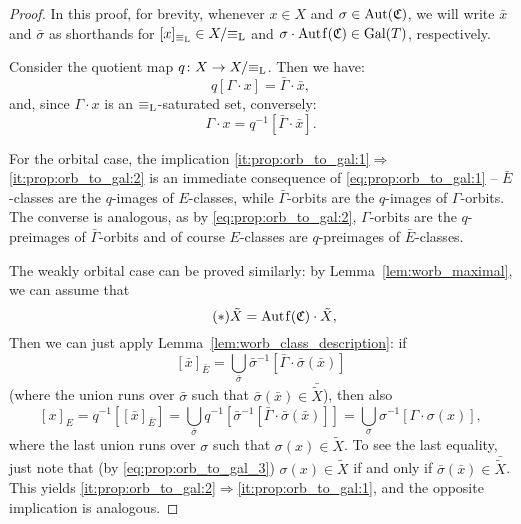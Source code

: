 	\begin{proof}
		In this proof, for brevity, whenever $x\in X$ and $\sigma \in \operatorname{{Aut}}({\mathfrak C})$, we will write $\bar x$ and $\bar \sigma$ as shorthands for $[x]_{\equiv_{\mathrm{L}}}\in X/{\equiv_{\mathrm{L}}}$ and $\sigma\cdot \Autf(\fC)\in \Gal(T)$, respectively.
		
		Consider the quotient map $q\colon X\to X/{\equiv_{\mathrm{L}}}$. Then we have:
		\begin{equation}
		\label{eq:prop:orb_to_gal:1}
		\tag{$\dagger$}
		q[\Gamma\cdot x]=\bar{\Gamma}\cdot \bar x,
		\end{equation}
		and, since $\Gamma\cdot x$ is an $\equiv_{\mathrm{L}}$-saturated set, conversely:
		\begin{equation}
		\label{eq:prop:orb_to_gal:2}
		\tag{$\dagger\dagger$}
		\Gamma\cdot x=q^{-1}[\bar{\Gamma}\cdot \bar x].
		\end{equation}
		
		
		For the orbital case, the implication \ref{it:prop:orb_to_gal:1}$\Rightarrow$\ref{it:prop:orb_to_gal:2} is an immediate consequence of \eqref{eq:prop:orb_to_gal:1} -- $\bar E$-classes are the $q$-images of $E$-classes, while $\bar{\Gamma}$-orbits are the $q$-images of $\Gamma$-orbits. The converse is analogous, as by \eqref{eq:prop:orb_to_gal:2}, $\Gamma$-orbits are the $q$-preimages of $\bar \Gamma$-orbits and of course $E$-classes are $q$-preimages of $\bar E$-classes.
		
		The weakly orbital case can be proved similarly: by Lemma~\ref{lem:worb_maximal}, we can assume that
		\begin{equation}
		\label{eq:prop:orb_to_gal_3}
		\tag{$*$}
		\tilde X=\Autf(\fC)\cdot\tilde X,
		\end{equation}
		Then we can just apply Lemma~\ref{lem:worb_class_description}: if
		\[
		[\bar x]_{\bar E}=\bigcup_{\bar \sigma}\bar \sigma^{-1}[\bar \Gamma\cdot \bar\sigma(\bar x)]
		\]
		(where the union runs over $\bar \sigma$ such that $\bar \sigma(\bar x)\in \bar{\tilde X}$), then also
		\[
		[x]_E=q^{-1}[[\bar x]_{\bar E}]=\bigcup_{\bar \sigma}q^{-1}[\bar \sigma^{-1}[\bar \Gamma\cdot \bar\sigma(\bar x)]]=\bigcup_{\sigma}\sigma^{-1}[\Gamma\cdot \sigma(x)],
		\]
		where the last union runs over $\sigma$ such that $\sigma(x)\in \tilde X$. To see the last equality, just note that (by \eqref{eq:prop:orb_to_gal_3}) $\sigma(x)\in \tilde X$ if and only if $\bar\sigma(\bar x)\in \bar{\tilde X}$. This yields \ref{it:prop:orb_to_gal:2}$\Rightarrow$\ref{it:prop:orb_to_gal:1}, and the opposite implication is analogous.
	\end{proof}
	

